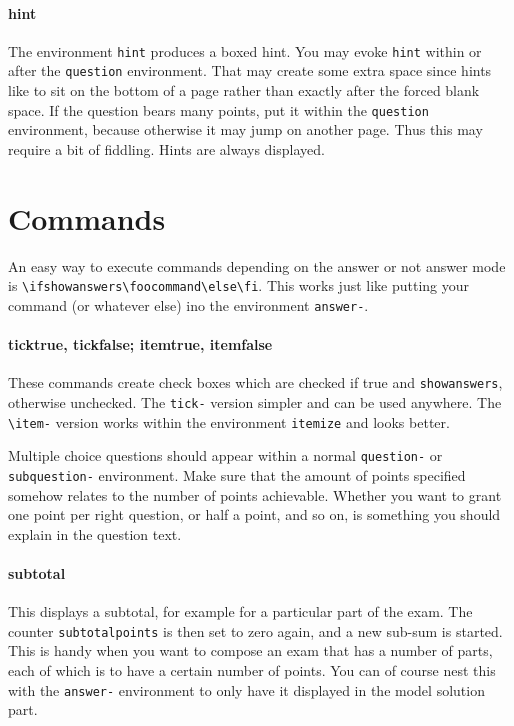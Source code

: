\documentclass[a4paper]{scrartcl}
\begin{document}
\paragraph{hint}

The environment \verb|hint| produces a boxed hint. You may evoke \verb|hint| within or after the \verb|question| environment. That may create some extra space since hints like to sit on the bottom of a page rather than exactly after the forced blank space. If the question bears many points, put it within the \verb|question| environment, because otherwise it may jump on another page. Thus this may require a bit of fiddling. Hints are always displayed.

\section*{Commands}

An easy way to execute commands depending on the answer or not answer mode is \verb|\ifshowanswers\foocommand\else\fi|. This works just like putting your command (or whatever else) ino the environment \verb|answer-|.

\paragraph{ticktrue, tickfalse; itemtrue, itemfalse}

These  commands create check boxes which are checked if true and \verb|showanswers|, otherwise unchecked. The \verb|tick-| version  simpler and can be used anywhere. The \verb|\item-| version works within the environment \verb|itemize| and looks better.  

Multiple choice questions should appear within a normal \verb|question-| or \verb|subquestion-| environment. Make sure that the amount of points specified somehow relates to the number of points achievable. Whether you want to grant one point per right question, or half a point, and so on, is something you should explain in the question text. 

\paragraph{subtotal}

This displays a subtotal, for example for a particular part of the exam. The counter \verb|subtotalpoints| is then set to zero again, and a new sub-sum is started.  This is handy when you want to compose an exam that has a number of parts, each of which is to have a certain number of points. You can of course nest this with the \verb|answer-| environment to only have it displayed in the model solution part. 
\end{document}
